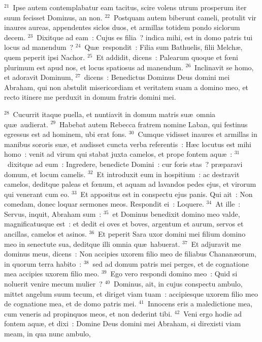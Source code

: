 ${}^{21}$~Ipse autem contemplabatur eam tacitus, scire volens utrum prosperum iter suum fecisset Dominus, an non.
${}^{22}$~Postquam autem biberunt cameli, protulit vir inaures aureas, appendentes siclos duos, et armillas totidem pondo siclorum decem.
${}^{23}$~Dixitque ad eam~: Cujus es filia~? indica mihi, est in domo patris tui locus ad manendum~?
${}^{24}$~Qu\ae\ respondit~: Filia sum Bathuelis, filii Melch\ae , quem peperit ipsi Nachor.
${}^{25}$~Et addidit, dicens~: Palearum quoque et fœni plurimum est apud nos, et locus spatiosus ad manendum.
${}^{26}$~Inclinavit se homo, et adoravit Dominum,
${}^{27}$~dicens~: Benedictus Dominus Deus domini mei Abraham, qui non abstulit misericordiam et veritatem suam a domino meo, et recto itinere me perduxit in domum fratris domini mei.


${}^{28}$~Cucurrit itaque puella, et nuntiavit in domum matris su\ae\ omnia qu\ae\ audierat.
${}^{29}$~Habebat autem Rebecca fratrem nomine Laban, qui festinus egressus est ad hominem, ubi erat fons.
${}^{30}$~Cumque vidisset inaures et armillas in manibus sororis su\ae , et audisset cuncta verba referentis~: H\ae c locutus est mihi homo~: venit ad virum qui stabat juxta camelos, et prope fontem aqu\ae~:
${}^{31}$~dixitque ad eum~: Ingredere, benedicte Domini~: cur foris stas~? pr\ae paravi domum, et locum camelis.
${}^{32}$~Et introduxit eum in hospitium~: ac destravit camelos, deditque paleas et fœnum, et aquam ad lavandos pedes ejus, et virorum qui venerant cum eo.
${}^{33}$~Et appositus est in conspectu ejus panis. Qui ait~: Non comedam, donec loquar sermones meos. Respondit ei~: Loquere.
${}^{34}$~At ille~: Servus, inquit, Abraham sum~:
${}^{35}$~et Dominus benedixit domino meo valde, magnificatusque est~: et dedit ei oves et boves, argentum et aurum, servos et ancillas, camelos et asinos.
${}^{36}$~Et peperit Sara uxor domini mei filium domino meo in senectute sua, deditque illi omnia qu\ae\ habuerat.
${}^{37}$~Et adjuravit me dominus meus, dicens~: Non accipies uxorem filio meo de filiabus Chanan\ae orum, in quorum terra habito~:
${}^{38}$~sed ad domum patris mei perges, et de cognatione mea accipies uxorem filio meo.
${}^{39}$~Ego vero respondi domino meo~: Quid si noluerit venire mecum mulier~?
${}^{40}$~Dominus, ait, in cujus conspectu ambulo, mittet angelum suum tecum, et diriget viam tuam~: accipiesque uxorem filio meo de cognatione mea, et de domo patris mei.
${}^{41}$~Innocens eris a maledictione mea, cum veneris ad propinquos meos, et non dederint tibi.
${}^{42}$~Veni ergo hodie ad fontem aqu\ae , et dixi~: Domine Deus domini mei Abraham, si direxisti viam meam, in qua nunc ambulo,
